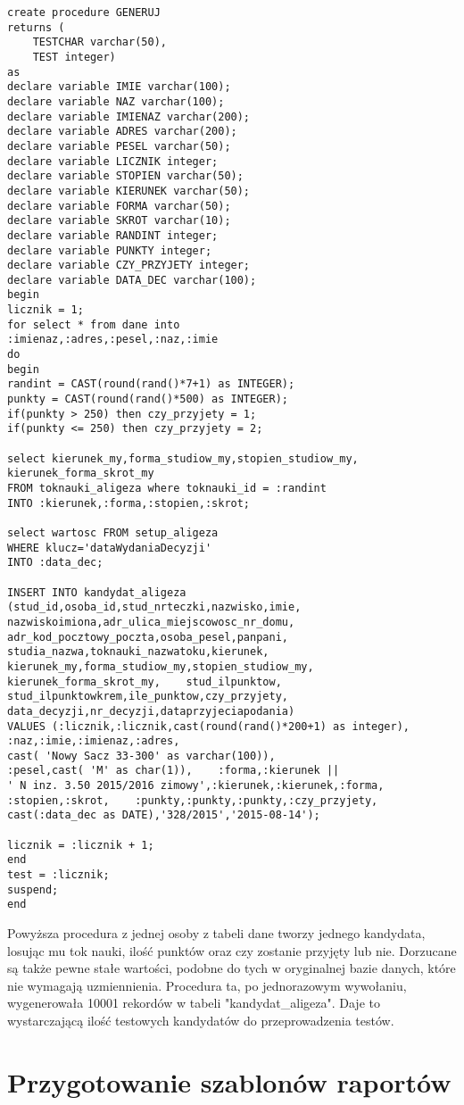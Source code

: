 \begin{lstlisting}
create procedure GENERUJ
returns (
    TESTCHAR varchar(50),
    TEST integer)
as
declare variable IMIE varchar(100);
declare variable NAZ varchar(100);
declare variable IMIENAZ varchar(200);
declare variable ADRES varchar(200);
declare variable PESEL varchar(50);
declare variable LICZNIK integer;
declare variable STOPIEN varchar(50);
declare variable KIERUNEK varchar(50);
declare variable FORMA varchar(50);
declare variable SKROT varchar(10);
declare variable RANDINT integer;
declare variable PUNKTY integer;
declare variable CZY_PRZYJETY integer;
declare variable DATA_DEC varchar(100);
begin
licznik = 1;
for select * from dane into
:imienaz,:adres,:pesel,:naz,:imie
do
begin
randint = CAST(round(rand()*7+1) as INTEGER);
punkty = CAST(round(rand()*500) as INTEGER);
if(punkty > 250) then czy_przyjety = 1;
if(punkty <= 250) then czy_przyjety = 2;

select kierunek_my,forma_studiow_my,stopien_studiow_my,
kierunek_forma_skrot_my
FROM toknauki_aligeza where toknauki_id = :randint
INTO :kierunek,:forma,:stopien,:skrot;

select wartosc FROM setup_aligeza 
WHERE klucz='dataWydaniaDecyzji'
INTO :data_dec;

INSERT INTO kandydat_aligeza
(stud_id,osoba_id,stud_nrteczki,nazwisko,imie,
nazwiskoimiona,adr_ulica_miejscowosc_nr_domu,
adr_kod_pocztowy_poczta,osoba_pesel,panpani,
studia_nazwa,toknauki_nazwatoku,kierunek,
kierunek_my,forma_studiow_my,stopien_studiow_my,
kierunek_forma_skrot_my,    stud_ilpunktow,
stud_ilpunktowkrem,ile_punktow,czy_przyjety,
data_decyzji,nr_decyzji,dataprzyjeciapodania)
VALUES (:licznik,:licznik,cast(round(rand()*200+1) as integer),
:naz,:imie,:imienaz,:adres, 
cast( 'Nowy Sacz 33-300' as varchar(100)),
:pesel,cast( 'M' as char(1)),    :forma,:kierunek || 
' N inz. 3.50 2015/2016 zimowy',:kierunek,:kierunek,:forma,
:stopien,:skrot,    :punkty,:punkty,:punkty,:czy_przyjety,
cast(:data_dec as DATE),'328/2015','2015-08-14');

licznik = :licznik + 1;
end
test = :licznik;
suspend;
end
\end{lstlisting}
Powyższa procedura z jednej osoby z tabeli dane tworzy jednego kandydata, losując mu tok nauki, ilość punktów oraz czy zostanie przyjęty lub nie. Dorzucane są także pewne stałe wartości, podobne do tych w oryginalnej bazie danych, które nie wymagają uzmiennienia. Procedura ta, po jednorazowym wywołaniu, wygenerowała 10001 rekordów w tabeli "kandydat\_aligeza". Daje to wystarczającą ilość testowych kandydatów do przeprowadzenia testów.

\section{ Przygotowanie szablonów raportów}

